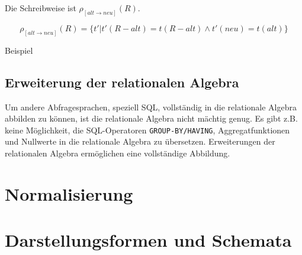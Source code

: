\documentclass{scrbook}
\begin{document}
Die Schreibweise ist $ρ_[alt → neu](R)$.

\begin{definition}
\begin{displaymath}
ρ_[alt → neu](R) = \{ t' | t'(R - alt) = t(R-alt) ∧ t'(neu)=t(alt) \}
\end{displaymath}
\end{definition}

Beispiel

% 






\section{Erweiterung der relationalen Algebra}

Um andere Abfragesprachen, speziell SQL, vollständig in die relationale Algebra
abbilden zu können, ist die relationale Algebra nicht mächtig genug.
Es gibt z.B. keine Möglichkeit, die SQL-Operatoren 
\lstinline{GROUP-BY/HAVING}, Aggregatfunktionen und Nullwerte in die relationale
Algebra zu übersetzen.
Erweiterungen der relationalen Algebra ermöglichen eine vollständige Abbildung.






\chapter{Normalisierung}


\chapter{Darstellungsformen und Schemata}
\end{document}
